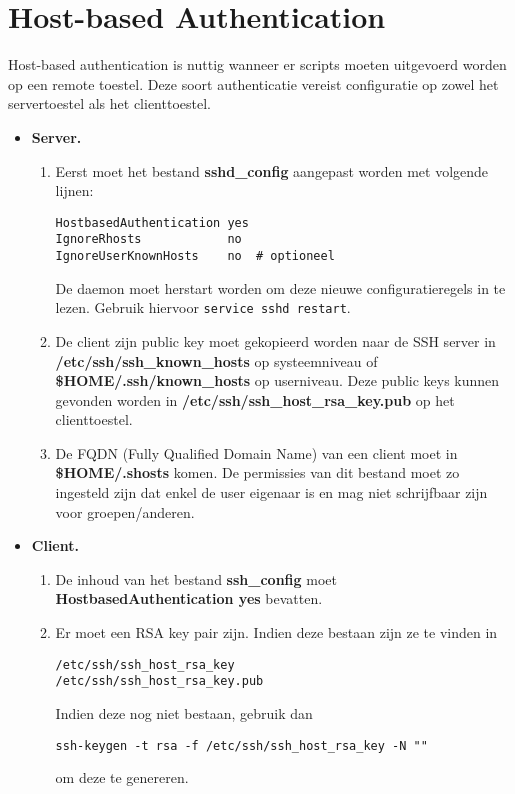 \documentclass{report}
\begin{document}
	\section{Host-based Authentication}
	Host-based authentication is nuttig wanneer er scripts moeten uitgevoerd worden op een remote toestel. Deze soort authenticatie vereist configuratie op zowel het servertoestel als het clienttoestel. 
	\begin{itemize}
		\item \textbf{Server.}
			\begin{enumerate}
				\item Eerst moet het bestand \textbf{sshd\_config} aangepast worden met volgende lijnen:
				\begin{lstlisting}
HostbasedAuthentication yes
IgnoreRhosts            no
IgnoreUserKnownHosts    no  # optioneel
				\end{lstlisting}
				De daemon moet herstart worden om deze nieuwe configuratieregels in te lezen. Gebruik hiervoor \texttt{service sshd restart}.
				
				\item De client zijn public key moet gekopieerd worden naar de SSH server in \textbf{ /etc/ssh/ssh\_known\_hosts} op systeemniveau of \textbf{\$HOME/.ssh/known\_hosts} op userniveau. Deze public keys kunnen gevonden worden in \textbf{/etc/ssh/ssh\_host\_rsa\_key.pub} op het clienttoestel.
				\item De FQDN (Fully Qualified Domain Name) van een client moet in \textbf{\$HOME/.shosts} komen. De permissies van dit bestand moet zo ingesteld zijn dat enkel de user eigenaar is en mag niet schrijfbaar zijn voor groepen/anderen.
			\end{enumerate}
		\item \textbf{Client.}
			\begin{enumerate}
				\item De inhoud van het bestand \textbf{ssh\_config} moet \textbf{HostbasedAuthentication yes} bevatten.
				
				\item Er moet een RSA key pair zijn. Indien deze bestaan zijn ze te vinden in 
				\begin{lstlisting}
/etc/ssh/ssh_host_rsa_key
/etc/ssh/ssh_host_rsa_key.pub
				\end{lstlisting}
				Indien deze nog niet bestaan, gebruik dan
				\begin{lstlisting}
ssh-keygen -t rsa -f /etc/ssh/ssh_host_rsa_key -N ""
				\end{lstlisting}
				om deze te genereren.
			\end{enumerate}
	\end{itemize}
\end{document}
